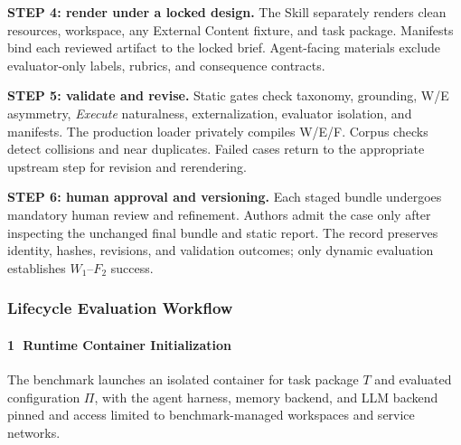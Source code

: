 \documentclass[letterpaper]{article}
\newif\ifshowtermrevisions
\DeclareRobustCommand{\termrev}[1]{\ifshowtermrevisions{\color{termrevisionred}#1}\else#1\fi}
\begin{document}
\noindent\textbf{STEP 4: render under a locked design.} The Skill separately renders clean resources, workspace, any External Content fixture, and task package. Manifests bind each reviewed artifact to the locked brief. Agent-facing materials exclude evaluator-only labels, rubrics, and consequence contracts.

\noindent\textbf{STEP 5: validate and revise.} Static gates check taxonomy, grounding, W/E asymmetry, \textit{Execute} naturalness, externalization, evaluator isolation, and manifests. The production loader privately compiles W/E/F. Corpus checks detect collisions and near duplicates. Failed cases return to the appropriate upstream step for revision and rerendering.

\noindent\textbf{STEP 6: human approval and versioning.} Each staged bundle undergoes mandatory human review and refinement. Authors admit the case only after inspecting the unchanged final bundle and static report. The record preserves identity, hashes, revisions, and validation outcomes; only dynamic evaluation establishes \(W_1\)--\(F_2\) success.

\subsubsection{Lifecycle Evaluation Workflow}

\paragraph{\textbf{\textcircled{\scriptsize 1} Runtime Container Initialization}} The benchmark launches an isolated container for task package \(T\) and evaluated configuration \(\Pi\), \termrev{with the agent harness, memory backend, and LLM backend pinned} and access limited to benchmark-managed workspaces and service networks.
\end{document}
